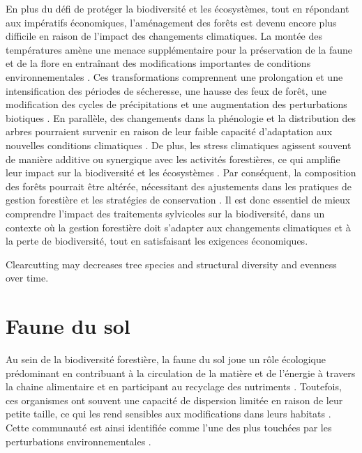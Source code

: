 En plus du défi de protéger la biodiversité et les écosystèmes, tout en répondant aux impératifs économiques, l'aménagement des forêts est devenu encore plus difficile en raison de l'impact des changements climatiques. 
La montée des températures amène une menace supplémentaire pour la préservation de la faune et de la flore en entraînant des modifications importantes de conditions environnementales \citep{McKenney2009Climatechange,Trumbore2015Foresthealth,Seidl2017Forestdisturbances,Messier2022Warningnatural}. 
Ces transformations comprennent une prolongation et une intensification des périodes de sécheresse, une hausse des feux de forêt, une modification des cycles de précipitations et une augmentation des perturbations biotiques \citep{Parmesan2007Influencesspecies,Joyce2013Climatechange,Gatti2021Amazoniacarbon,Heidari2021Effectsclimate}. 
En parallèle, des changements dans la phénologie et la distribution des arbres pourraient survenir en raison de leur faible capacité d'adaptation aux nouvelles conditions climatiques \citep{Aitken2008Adaptationmigration,Chuine2010Whydoes,Zhu2012Failuremigrate,Gray2013Trackingsuitable}. 
De plus, les stress climatiques agissent souvent de manière additive ou synergique avec les activités forestières, ce qui amplifie leur impact sur la biodiversité et les écosystèmes \citep{Brook2008Synergiesextinction,Tremblay2018Harvestinginteracts,Ochs2022Responseterrestrial,Bouderbala2023Longtermeffect}. 
Par conséquent, la composition des forêts pourrait être altérée, nécessitant des ajustements dans les pratiques de gestion forestière et les stratégies de conservation \citep{McKenney2009Climatechange,Chmura2011Forestresponses,Lo2011Linkingclimate}. 
Il est donc essentiel de mieux comprendre l'impact des traitements sylvicoles sur la biodiversité, dans un contexte où la gestion forestière doit s'adapter aux changements climatiques et à la perte de biodiversité, tout en satisfaisant les exigences économiques. 


Clearcutting may decreases tree species and structural diversity and evenness over time.


\section*{Faune du sol}
\label{sec:soilfauna}


Au sein de la biodiversité forestière, la faune du sol joue un rôle écologique prédominant en contribuant à la circulation de la matière et de l'énergie à travers la chaine alimentaire et en participant au recyclage des nutriments \citep{Seibold2021contributioninsects,Kudrin2023metaanalysiseffects}. 
Toutefois, ces organismes ont souvent une capacité de dispersion limitée en raison de leur petite taille, ce qui les rend sensibles aux modifications dans leurs habitats \citep{Kudrin2023metaanalysiseffects}. 
Cette communauté est ainsi identifiée comme l'une des plus touchées par les perturbations environnementales \citep{Marshall2000Impactsforest,Coyle2017Soilfauna}. 

